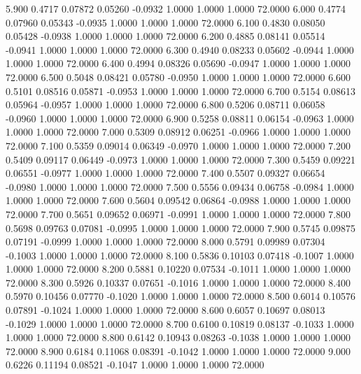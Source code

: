    5.900   0.4717   0.07872   0.05260  -0.0932   1.0000   1.0000   1.0000  72.0000
   6.000   0.4774   0.07960   0.05343  -0.0935   1.0000   1.0000   1.0000  72.0000
   6.100   0.4830   0.08050   0.05428  -0.0938   1.0000   1.0000   1.0000  72.0000
   6.200   0.4885   0.08141   0.05514  -0.0941   1.0000   1.0000   1.0000  72.0000
   6.300   0.4940   0.08233   0.05602  -0.0944   1.0000   1.0000   1.0000  72.0000
   6.400   0.4994   0.08326   0.05690  -0.0947   1.0000   1.0000   1.0000  72.0000
   6.500   0.5048   0.08421   0.05780  -0.0950   1.0000   1.0000   1.0000  72.0000
   6.600   0.5101   0.08516   0.05871  -0.0953   1.0000   1.0000   1.0000  72.0000
   6.700   0.5154   0.08613   0.05964  -0.0957   1.0000   1.0000   1.0000  72.0000
   6.800   0.5206   0.08711   0.06058  -0.0960   1.0000   1.0000   1.0000  72.0000
   6.900   0.5258   0.08811   0.06154  -0.0963   1.0000   1.0000   1.0000  72.0000
   7.000   0.5309   0.08912   0.06251  -0.0966   1.0000   1.0000   1.0000  72.0000
   7.100   0.5359   0.09014   0.06349  -0.0970   1.0000   1.0000   1.0000  72.0000
   7.200   0.5409   0.09117   0.06449  -0.0973   1.0000   1.0000   1.0000  72.0000
   7.300   0.5459   0.09221   0.06551  -0.0977   1.0000   1.0000   1.0000  72.0000
   7.400   0.5507   0.09327   0.06654  -0.0980   1.0000   1.0000   1.0000  72.0000
   7.500   0.5556   0.09434   0.06758  -0.0984   1.0000   1.0000   1.0000  72.0000
   7.600   0.5604   0.09542   0.06864  -0.0988   1.0000   1.0000   1.0000  72.0000
   7.700   0.5651   0.09652   0.06971  -0.0991   1.0000   1.0000   1.0000  72.0000
   7.800   0.5698   0.09763   0.07081  -0.0995   1.0000   1.0000   1.0000  72.0000
   7.900   0.5745   0.09875   0.07191  -0.0999   1.0000   1.0000   1.0000  72.0000
   8.000   0.5791   0.09989   0.07304  -0.1003   1.0000   1.0000   1.0000  72.0000
   8.100   0.5836   0.10103   0.07418  -0.1007   1.0000   1.0000   1.0000  72.0000
   8.200   0.5881   0.10220   0.07534  -0.1011   1.0000   1.0000   1.0000  72.0000
   8.300   0.5926   0.10337   0.07651  -0.1016   1.0000   1.0000   1.0000  72.0000
   8.400   0.5970   0.10456   0.07770  -0.1020   1.0000   1.0000   1.0000  72.0000
   8.500   0.6014   0.10576   0.07891  -0.1024   1.0000   1.0000   1.0000  72.0000
   8.600   0.6057   0.10697   0.08013  -0.1029   1.0000   1.0000   1.0000  72.0000
   8.700   0.6100   0.10819   0.08137  -0.1033   1.0000   1.0000   1.0000  72.0000
   8.800   0.6142   0.10943   0.08263  -0.1038   1.0000   1.0000   1.0000  72.0000
   8.900   0.6184   0.11068   0.08391  -0.1042   1.0000   1.0000   1.0000  72.0000
   9.000   0.6226   0.11194   0.08521  -0.1047   1.0000   1.0000   1.0000  72.0000
